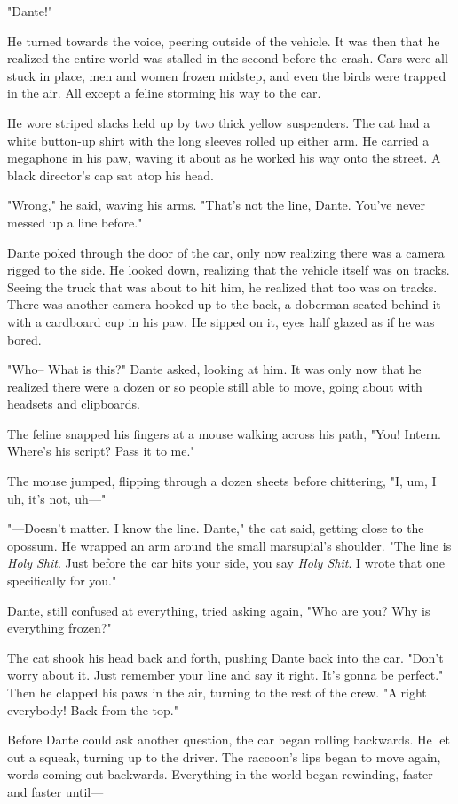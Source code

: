 "Dante!"

He turned towards the voice, peering outside of the vehicle. It was then that he realized the entire world was stalled in the second before the crash. Cars were all stuck in place, men and women frozen midstep, and even the birds were trapped in the air. All except a feline storming his way to the car.

He wore striped slacks held up by two thick yellow suspenders. The cat had a white button-up shirt with the long sleeves rolled up either arm. He carried a megaphone in his paw, waving it about as he worked his way onto the street. A black director's cap sat atop his head.

"Wrong," he said, waving his arms. "That's not the line, Dante. You've never messed up a line before."

Dante poked through the door of the car, only now realizing there was a camera rigged to the side. He looked down, realizing that the vehicle itself was on tracks. Seeing the truck that was about to hit him, he realized that too was on tracks. There was another camera hooked up to the back, a doberman seated behind it with a cardboard cup in his paw. He sipped on it, eyes half glazed as if he was bored.

"Who-- What is this?" Dante asked, looking at him. It was only now that he realized there were a dozen or so people still able to move, going about with headsets and clipboards.

The feline snapped his fingers at a mouse walking across his path, "You! Intern. Where's his script? Pass it to me."

The mouse jumped, flipping through a dozen sheets before chittering, "I, um, I uh, it's not, uh---"

"---Doesn't matter. I know the line. Dante," the cat said, getting close to the opossum. He wrapped an arm around the small marsupial's shoulder. "The line is \emph{Holy Shit}. Just before the car hits your side, you say \emph{Holy Shit}. I wrote that one specifically for you."

Dante, still confused at everything, tried asking again, "Who are you? Why is everything frozen?"

The cat shook his head back and forth, pushing Dante back into the car. "Don't worry about it. Just remember your line and say it right. It's gonna be perfect." Then he clapped his paws in the air, turning to the rest of the crew. "Alright everybody! Back from the top."

Before Dante could ask another question, the car began rolling backwards. He let out a squeak, turning up to the driver. The raccoon's lips began to move again, words coming out backwards. Everything in the world began rewinding, faster and faster until---

